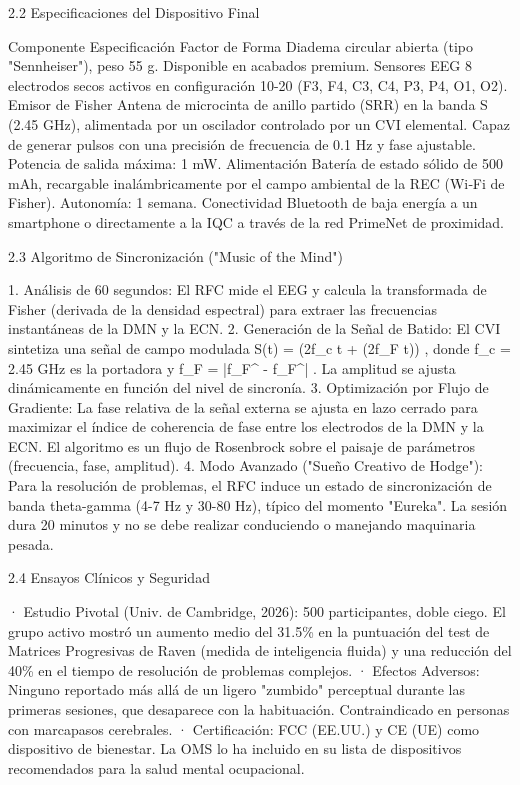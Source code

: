 \documentclass[12pt,twoside]{book}
\begin{document}
2.2 Especificaciones del Dispositivo Final

Componente Especificación
Factor de Forma Diadema circular abierta (tipo "Sennheiser"), peso 55 g. Disponible en acabados premium.
Sensores EEG 8 electrodos secos activos en configuración 10-20 (F3, F4, C3, C4, P3, P4, O1, O2).
Emisor de Fisher Antena de microcinta de anillo partido (SRR) en la banda S (2.45 GHz), alimentada por un oscilador controlado por un CVI elemental. Capaz de generar pulsos con una precisión de frecuencia de 0.1 Hz y fase ajustable. Potencia de salida máxima: 1 mW.
Alimentación Batería de estado sólido de 500 mAh, recargable inalámbricamente por el campo ambiental de la REC (Wi‑Fi de Fisher). Autonomía: 1 semana.
Conectividad Bluetooth de baja energía a un smartphone o directamente a la IQC a través de la red PrimeNet de proximidad.

2.3 Algoritmo de Sincronización ("Music of the Mind")

1. Análisis de 60 segundos: El RFC mide el EEG y calcula la transformada de Fisher (derivada de la densidad espectral) para extraer las frecuencias instantáneas de la DMN y la ECN.
2. Generación de la Señal de Batido: El CVI sintetiza una señal de campo modulada  S(t) = \cos(2\pi f_c t + \beta \sin(2\pi \Delta f_F t)) , donde  f_c = 2.45  GHz es la portadora y  \Delta f_F = |f_F^{} - f_F^{}| . La amplitud se ajusta dinámicamente en función del nivel de sincronía.
3. Optimización por Flujo de Gradiente: La fase relativa de la señal externa se ajusta en lazo cerrado para maximizar el índice de coherencia de fase entre los electrodos de la DMN y la ECN. El algoritmo es un flujo de Rosenbrock sobre el paisaje de parámetros (frecuencia, fase, amplitud).
4. Modo Avanzado ("Sueño Creativo de Hodge"): Para la resolución de problemas, el RFC induce un estado de sincronización de banda theta-gamma (4-7 Hz y 30-80 Hz), típico del momento "Eureka". La sesión dura 20 minutos y no se debe realizar conduciendo o manejando maquinaria pesada.

2.4 Ensayos Clínicos y Seguridad

· Estudio Pivotal (Univ. de Cambridge, 2026): 500 participantes, doble ciego. El grupo activo mostró un aumento medio del 31.5\% en la puntuación del test de Matrices Progresivas de Raven (medida de inteligencia fluida) y una reducción del 40\% en el tiempo de resolución de problemas complejos.
· Efectos Adversos: Ninguno reportado más allá de un ligero "zumbido" perceptual durante las primeras sesiones, que desaparece con la habituación. Contraindicado en personas con marcapasos cerebrales.
· Certificación: FCC (EE.UU.) y CE (UE) como dispositivo de bienestar. La OMS lo ha incluido en su lista de dispositivos recomendados para la salud mental ocupacional.
\end{document}
